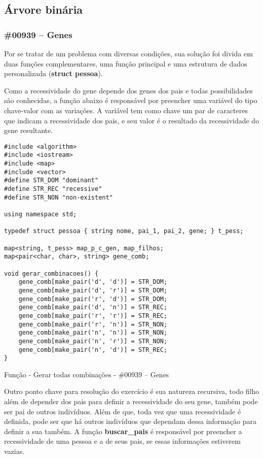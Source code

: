 \documentclass[a4paper,12pt]{scrartcl}
\begin{document}
\subsection{Árvore binária}
\subsubsection{\#00939 – Genes}
Por se tratar de um problema com diversas condições, sua solução foi divida em duas funções complementares, uma função principal e uma estrutura de dados personalizada (\textbf{struct pessoa}).

Como a recessividade do gene depende dos genes dos pais e todas possibilidades são conhecidas, a função abaixo é responsável por preencher uma variável do tipo chave-valor com as variações. A variável tem como chave um par de caracteres que indicam a recessividade dos pais, e seu valor é o resultado da recessividade do gene resultante.
\begin{listing}[H]
\begin{verbatim}
#include <algorithm>
#include <iostream>
#include <map>
#include <vector>
#define STR_DOM "dominant"
#define STR_REC "recessive"
#define STR_NON "non-existent"

using namespace std;

typedef struct pessoa { string nome, pai_1, pai_2, gene; } t_pess;

map<string, t_pess> map_p_c_gen, map_filhos;
map<pair<char, char>, string> gene_comb;

void gerar_combinacoes() {
    gene_comb[make_pair('d', 'd')] = STR_DOM;
    gene_comb[make_pair('d', 'r')] = STR_DOM;
    gene_comb[make_pair('r', 'd')] = STR_DOM;
    gene_comb[make_pair('d', 'n')] = STR_REC;
    gene_comb[make_pair('r', 'r')] = STR_REC;
    gene_comb[make_pair('r', 'n')] = STR_NON;
    gene_comb[make_pair('n', 'n')] = STR_NON;
    gene_comb[make_pair('n', 'r')] = STR_NON;
    gene_comb[make_pair('n', 'd')] = STR_REC;
}
\end{verbatim}
\caption{\footnotesize{Função - Gerar todas combinações - \#00939 – Genes}}
\end{listing}

Outro ponto chave para resolução do exercício é sua natureza recursiva, todo filho além de depender dos pais para definir a recessividade do seu gene, também pode ser pai de outros indivíduos. Além de que, toda vez que uma recessividade é definida, pode ser que há outros indivíduos que dependam dessa informação para definir a sua também. A função \textbf{buscar\_pais} é responsável por preencher a recessividade de uma pessoa e a de seus pais, se essas informações estiverem vazias.
\end{document}
